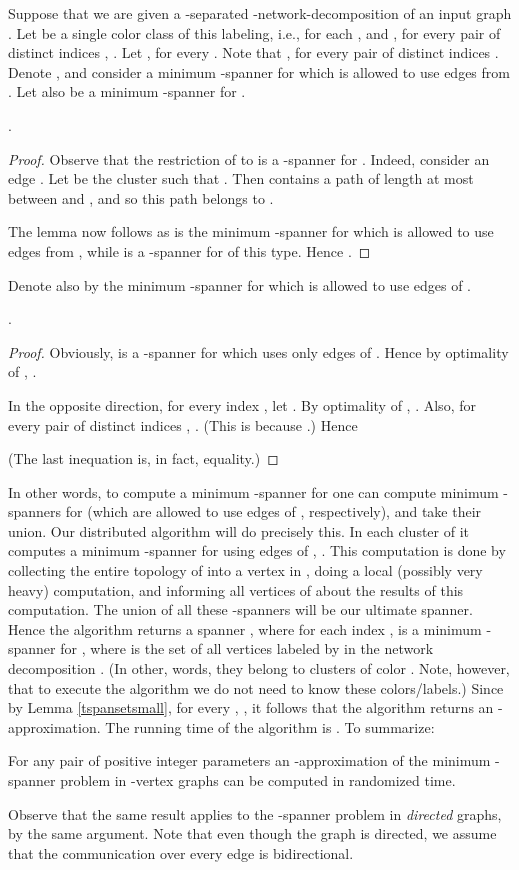 \documentclass[11pt]{article}
\begin{document}
Suppose that we are given a -separated -network-decomposition  of an input graph .
Let  be a single color class of this labeling, i.e.,  for each , and , for every pair of distinct indices , . Let , for every . Note that , for every pair of distinct indices . Denote , and consider a minimum -spanner  for  which is allowed to use edges from . Let also  be a minimum -spanner for .
\begin{lem} \label{tspan}
.
\end{lem}
\begin{proof}
Observe that the restriction  of  to  is a -spanner for . Indeed, consider an edge . Let  be the cluster such that . Then  contains a path of length at most  between  and , and so this path belongs to .

The lemma now follows as  is the minimum -spanner for  which is allowed to use edges from , while  is a -spanner for  of this type. Hence .
\end{proof}
Denote also by  the minimum -spanner for  which is allowed to use edges of .
\begin{lem} \label{tspansetsmall}
.
\end{lem}
\begin{proof}
Obviously,  is a -spanner for  which uses only edges of . Hence by optimality of , .

In the opposite direction, for every index , let . By optimality of , . Also, for every pair of distinct indices , . (This is because .)
Hence
 
(The last inequation is, in fact, equality.)
\end{proof}
In other words, to compute a minimum -spanner  for  one can compute minimum -spanners  for  (which are allowed to use edges of , respectively), and take their union.
Our distributed algorithm will do precisely this. In each cluster  of  it computes a minimum -spanner for  using edges of , . This computation is done by collecting the entire topology of  into a vertex in , doing a local (possibly very heavy) computation, and informing all vertices of  about the results of this computation. The union of all these -spanners will be our ultimate spanner. Hence the algorithm returns a spanner , where for each index ,  is a minimum -spanner for , where  is the set of all vertices labeled by  in the network decomposition . (In other, words, they belong to clusters of color . Note, however, that to execute the algorithm we do not need to know these colors/labels.) Since by Lemma \ref{tspansetsmall}, for every , , it follows that the algorithm returns an -approximation. The running time of the algorithm is . To summarize:
\begin{thm}
For any pair of positive integer parameters  an -approximation of the minimum -spanner problem in -vertex graphs can be computed in  randomized time.
\end{thm}
Observe that the same result applies to the -spanner problem in {\em directed} graphs, by the same argument. Note that even though the graph is directed, we assume that the communication over every edge is bidirectional. 
\end{document}
